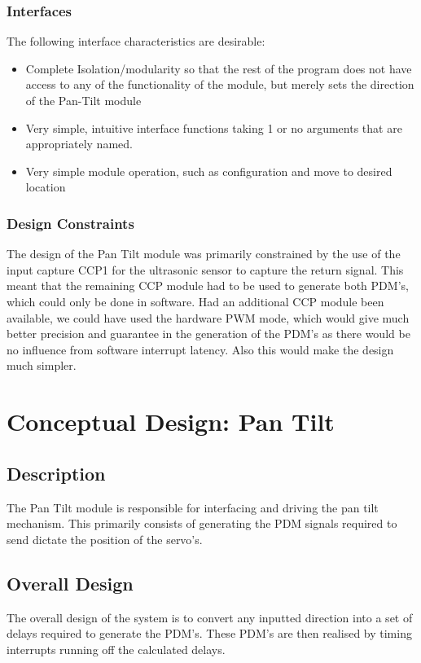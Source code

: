 \documentclass[]{report}
\begin{document}
\subsubsection{Interfaces}
The following interface characteristics are desirable:
\begin{itemize}
	\item Complete Isolation/modularity so that the rest of the program does not have access to any of the functionality of the module, but merely sets the direction of the Pan-Tilt module
	\item Very simple, intuitive interface functions taking 1 or no arguments that are appropriately named.
	\item Very simple module operation, such as configuration and move to desired location
\end{itemize}

\subsubsection{Design Constraints}
The design of the Pan Tilt module was primarily constrained by the use of the input capture CCP1 for the ultrasonic sensor to capture the return signal. This meant that the remaining CCP module had to be used to generate both PDM's, which could only be done in software. Had an additional CCP module been available, we could have used the hardware PWM mode, which would give much better precision and guarantee in the generation of the PDM's as there would be no influence from software interrupt latency. Also this would make the design much simpler.

\section{Conceptual Design: Pan Tilt}
\subsection{Description}
The Pan Tilt module is responsible for interfacing and driving the pan tilt mechanism. This primarily consists of generating the PDM signals required to send dictate the position of the servo's.

\subsection{Overall Design}
The overall design of the system is to convert any inputted direction into a set of delays required to generate the PDM's. These PDM's are then realised by timing interrupts running off the calculated delays.
\end{document}
